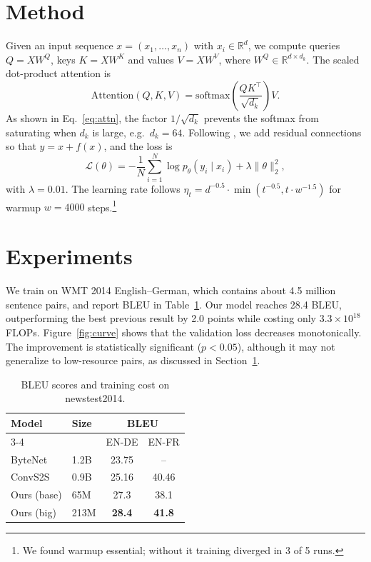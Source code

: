 \section{Method}\label{sec:method}
Given an input sequence $x = (x_1, \dots, x_n)$ with $x_i \in \mathbb{R}^{d}$, we compute queries $Q = XW^Q$, keys $K = XW^K$ and values $V = XW^V$, where $W^Q \in \mathbb{R}^{d \times d_k}$. The scaled dot-product attention is
\begin{equation}\label{eq:attn}
\mathrm{Attention}(Q,K,V) = \mathrm{softmax}\!\left(\frac{QK^\top}{\sqrt{d_k}}\right)V .
\end{equation}
As shown in Eq.~\eqref{eq:attn}, the factor $1/\sqrt{d_k}$ prevents the softmax from saturating when $d_k$ is large, e.g.\ $d_k = 64$. Following \cite{vaswani2017,he2016}, we add residual connections so that $y = x + f(x)$, and the loss is
\begin{equation}\label{eq:loss}
\mathcal{L}(\theta) = -\frac{1}{N}\sum_{i=1}^{N} \log p_\theta(y_i \mid x_i) + \lambda \lVert \theta \rVert_2^2 ,
\end{equation}
with $\lambda = 0.01$. The learning rate follows $\eta_t = d^{-0.5} \cdot \min(t^{-0.5}, t \cdot w^{-1.5})$ for warmup $w = 4000$ steps.\footnote{We found warmup essential; without it training diverged in 3 of 5 runs.}

\section{Experiments}\label{sec:exp}
We train on WMT 2014 English--German, which contains about 4.5 million sentence pairs, and report BLEU in Table~\ref{tab:res}. Our model reaches 28.4 BLEU, outperforming the best previous result by 2.0 points while costing only $3.3 \times 10^{18}$ FLOPs. Figure~\ref{fig:curve} shows that the validation loss decreases monotonically. The improvement is statistically significant ($p < 0.05$), although it may not generalize to low-resource pairs, as discussed in Section~\ref{sec:method}.

\begin{table}[t]\centering
\caption{BLEU scores and training cost on newstest2014.}\label{tab:res}
\begin{tabular}{llcc}\toprule
\multirow{2}{*}{Model} & \multirow{2}{*}{Size} & \multicolumn{2}{c}{BLEU} \\ \cmidrule(lr){3-4}
 & & EN-DE & EN-FR \\ \midrule
ByteNet & 1.2B & 23.75 & -- \\
ConvS2S & 0.9B & 25.16 & 40.46 \\
Ours (base) & 65M & 27.3 & 38.1 \\
Ours (big) & 213M & \textbf{28.4} & \textbf{41.8} \\ \bottomrule
\end{tabular}\end{table}

